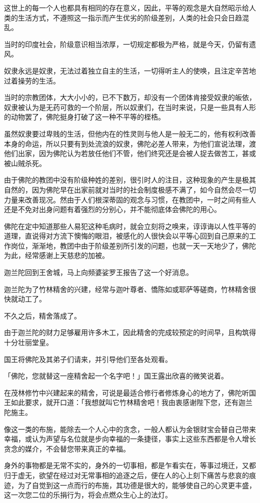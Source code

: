 \documentclass[12pt,twoside,openany]{book}
\begin{document}
这世上的每一个人也都具有相同的存在意义，因此，平等的观念是大自然昭示给人类的生活方式，不遵照这一指示而产生优劣的阶级差别，人类的社会只会日趋混乱。

当时的印度社会，阶级意识相当浓厚，一切规定都极为严格，就是今天，仍留有遗风。

奴隶永远是奴隶，无法过着独立自主的生活，一切得听主人的使唤，且注定辛苦地过着操劳的生活。

当时的宗教团体，大大小小的，已不下数万，却没有一个团体肯接受奴隶的皈依，奴隶被认为是无药可救的一个阶层，所以奴隶们，在当时来说，只是一些具有人形的动物罢了，佛陀挺身打破了这一种不平等的桎梏。

虽然奴隶要过卑贱的生活，但他内在的性灵则与他人是一般无二的，他有权利改善本身的命运，所以只要有到处流浪的奴隶，佛陀必差人带来，为他们宣说法理，渡他们出家，因为佛陀认为若放任他们不管，他们终究还是会被人捉去做苦工，甚或被山贼杀死。

由于佛陀的教团中没有阶级种姓的差别，很引时人的注目，这种现象的产生是极其自然的，因为佛陀早在出家前就对当时的社会制度极感不满了，如今自然会尽一切力量来改善现况。然由于人们根深蒂固的观念与习惯，在教团中，一时之间有些人还是不免对出身问题有着强烈的分别心，并不能彻底体会佛陀的用心。

佛陀在定中知道那些人易犯这种毛病时，就会立刻将之唤来，谆谆诲以人性平等的道理，直说得对方流下懊悔的眼泪，被感化的人很快会以平等心回到自己原来的工作岗位，渐渐地，教团中由于阶级差别所引发的问题，也就一天一天地少了，佛陀为此，经常感谢上天慈悲的加被。

迦兰陀回到王舍城，马上向频婆娑罗王报告了这一个好消息。

迦兰陀为了竹林精舍的兴建，经常与迦叶尊者、憍陈如或耶萨等磋商，竹林精舍很快就动工了。

不久之后，精舍落成了。

由于迦兰陀的财力足够雇用许多木工，因此精舍的完成较预定的时间早，且构筑得十分壮丽堂皇。

国王将佛陀及其弟子们请来，并引导他们至各处观看。

「佛陀，您就替这一座精舍起一个名字吧！」国王露出欣喜的微笑说着。

在茂林修竹中兴建起来的精舍，可说是最适合修行者修炼身心的地方了，佛陀听国王如此要求，就开口道：「我想就叫它竹林精舍吧！我由衷感谢陛下您，还有迦兰陀施主。

像这一类的布施，能除去一个人心中的贪念，一般人都认为金银财宝会替自己带来幸福，或认为声望与名位就是步向幸福的一条捷径，事实上这些东西都是令人增长贪念的媒介，不会替您带来真正的幸福。

身外的事物都是无常不实的，身外的一切事相，都是乍看实在，等事过境迁，又都归于虚无，欲望在经过对无常事相的追逐之后，便在人的心上刻下痛苦与悲哀的痕迹，为了自觉到这一点而行的布施，其功德是很大的，能够使自己的心灵更丰盛，这一次您二位的乐捐行为，将会点燃众生心上的法灯。
\end{document}
